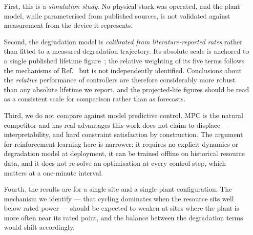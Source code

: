 \documentclass[conference]{IEEEtran}
\begin{document}
First, this is a \emph{simulation study}. No physical stack was operated, and the plant
model, while parameterised from published sources, is not validated against measurement
from the device it represents.

Second, the degradation model is \emph{calibrated from literature-reported rates} rather
than fitted to a measured degradation trajectory. Its absolute scale is anchored to a
single published lifetime figure~\cite{mpc_refuel_2026}; the relative weighting of its five
terms follows the mechanisms of Ref.~\cite{intermittency2025} but is not independently
identified. Conclusions about the \emph{relative} performance of controllers are therefore
considerably more robust than any absolute lifetime we report, and the projected-life
figures should be read as a consistent scale for comparison rather than as forecasts.

Third, we do not compare against model predictive control. MPC is the natural competitor
and has real advantages this work does not claim to displace --- interpretability, and hard
constraint satisfaction by construction. The argument for reinforcement learning here is
narrower: it requires no explicit dynamics or degradation model at deployment, it can be
trained offline on historical resource data, and it does not re-solve an optimisation at
every control step, which matters at a one-minute interval.

Fourth, the results are for a single site and a single plant configuration. The mechanism
we identify --- that cycling dominates when the resource sits well below rated power ---
should be expected to weaken at sites where the plant is more often near its rated point,
and the balance between the degradation terms would shift accordingly.



\end{document}
